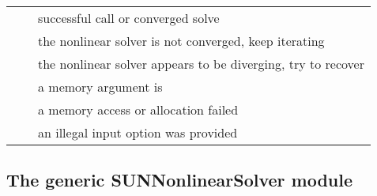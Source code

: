 \label{t:sunnonlinsol_returncodes}
\begin{xtabular}{|p{\ColumnOneA}|p{\ColumnTwoA}|p{\ColumnThreeA}|}
     &   & successful call or converged solve
\\[1mm]
    &   & the nonlinear solver is not
                                      converged, keep iterating
\\[1mm]
 &   & the nonlinear solver appears to
                                       be diverging, try to recover
\\[1mm]
   &  & a memory argument is 
\\[1mm]
   &  & a memory access or allocation failed
\\[1mm]
  &  & an illegal input option was provided
\\
\end{xtabular}
\bigskip


\subsection{The generic SUNNonlinearSolver module}
\label{ss:sunnonlinsol_generic}

